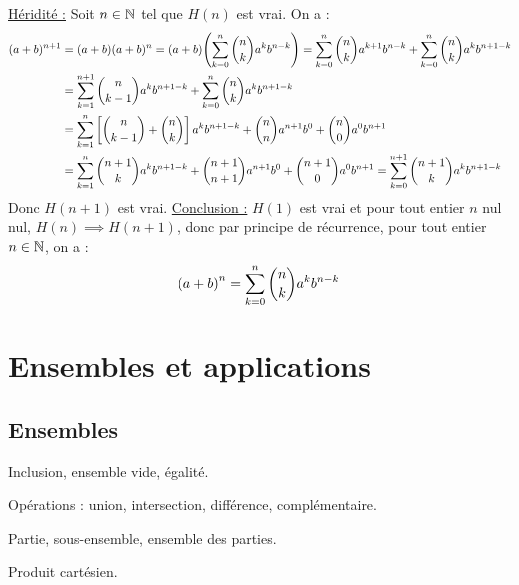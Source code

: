 \documentclass[a4paper,french,bookmarks]{book}
\begin{document}
\begin{enumerate}
\begin{nproof}
\begin{enumerate}
            \itt \underline{Héridité :} Soit $n \in \mathbb{N}$ tel que $H(n)$ est vrai. On a :
            \begin{align*}
                (a + b)^{n+1} &= (a+b)(a+b)^n = (a+b)\!\left(\sum_{k=0}^n \binom{n}{k} a^kb^{n-k}\right) = \sum_{k=0}^n \binom{n}{k} a^{k+1}b^{n-k} + \sum_{k=0}^n \binom{n}{k} a^kb^{n+1-k}\\
                &= \sum_{k=1}^{n+1} \binom{n}{k - 1} a^kb^{n+1-k} + \sum_{k=0}^n \binom{n}{k} a^kb^{n+1 - k}\\
                &= \sum_{k=1}^n \left[\binom{n}{k-1} + \binom{n}{k}\right]a^kb^{n+1-k} + \binom{n}{n}a^{n+1}b^0 + \binom{n}{0}a^0b^{n+1}\\
                &= \sum_{k=1}^n \binom{n+1}{k} a^kb^{n+1-k} + \binom{n+1}{n+1}a^{n+1}b^{0} + \binom{n+1}{0} a^0b^{n+1} = \sum_{k=0}^{n+1} \binom{n+1}{k} a^kb^{n+1-k}
            \end{align*}
            Donc $H(n+1)$ est vrai.
            \itt \underline{Conclusion :} $H(1)$ est vrai et pour tout entier $n$ nul nul, $H(n) \implies H(n+1)$, donc par principe de récurrence, pour tout entier $n \in \mathbb{N}$, on a :
            \[ \!\left(a + b\right)^n = \sum_{k=0}^n \binom{n}{k} a^kb^{n-k}\]
        \end{enumerate}
    \end{nproof}
    \yesbefore
    
    \end{enumerate}
    
    \cleardoublepage
    \def\khdate{du 27 septembre au 1er octobre 2021}
    \chapter{Ensembles et applications}
    
    \section*{Ensembles}
    
    \begin{enumerate}
        \ithand Inclusion, ensemble vide, égalité.
        
        \ithand Opérations : union, intersection, différence, complémentaire.
        
        \ithand Partie, sous-ensemble, ensemble des parties.
        
        \ithand Produit cartésien.
    \end{enumerate}
    
\end{document}

